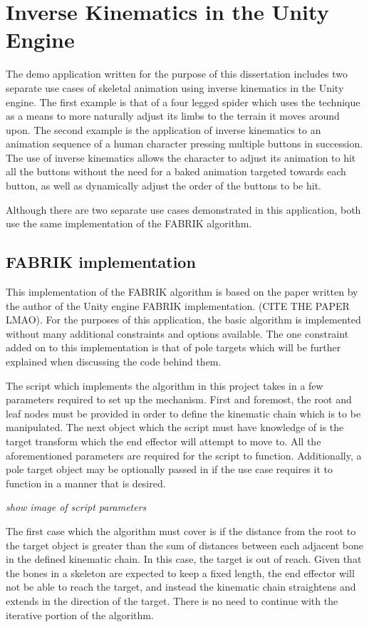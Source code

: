 \chapter{Inverse Kinematics in the Unity Engine} 
The demo application written for the purpose of this dissertation includes two
separate use cases of skeletal animation using inverse kinematics in the Unity
engine. The first example is that of a four legged spider which uses the
technique as a means to more naturally adjust its limbs to the terrain it moves
around upon. The second example is the application of inverse kinematics to an
animation sequence of a human character pressing multiple buttons in succession.
The use of inverse kinematics allows the character to adjust its animation to hit
all the buttons without the need for a baked animation targeted towards each
button, as well as dynamically adjust the order of the buttons to be hit.

Although there are two separate use cases demonstrated in this application, both
use the same implementation of the FABRIK algorithm. 


\section{FABRIK implementation}
This implementation of the FABRIK algorithm is based on the paper written by the
author of the Unity engine FABRIK implementation. (CITE THE PAPER LMAO). For the
purposes of this application, the basic algorithm is implemented without many
additional constraints and options available. The one constraint added on to
this implementation is that of pole targets which will be further explained when
discussing the code behind them.

The script which implements the algorithm in this project takes in a few
parameters required to set up the mechanism. First and foremost, the root and
leaf nodes must be provided in order to define the kinematic chain which is to
be manipulated. The next object which the script must have knowledge of is the
target transform which the end effector will attempt to move to. All the
aforementioned parameters are required for the script to function. Additionally,
a pole target object may be optionally passed in if the use case requires it to
function in a manner that is desired.

\textit{show image of script parameters}

The first case which the algorithm must cover is if the distance from the root
to the target object is greater than the sum of distances between each adjacent
bone in the defined kinematic chain. In this case, the target is out of reach. Given
that the bones in a skeleton are expected to keep a fixed length, the end
effector will not be able to reach the target, and instead the kinematic chain
straightens and extends in the direction of the target. There is no need to
continue with the iterative portion of the algorithm.

